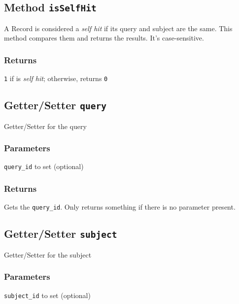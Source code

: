 \subsection*{Method \texttt{isSelfHit}\label{Method_isSelfHit}}


A Record is considered a \textit{self hit} if its query and subject are the same. This
method compares them and returns the results. It's case-sensitive.

\subsubsection*{Returns\label{Returns}}


\texttt{1} if is \textit{self hit}; otherwise, returns \texttt{0}

\subsection*{Getter/Setter \texttt{query}\label{Getter_Setter_query}}


Getter/Setter for the query

\subsubsection*{Parameters\label{Parameters}}
\begin{description}

\item[{\texttt{query\_id} to set (optional)}] \mbox{}\end{description}
\subsubsection*{Returns\label{Returns}}


Gets the \texttt{query\_id}. Only returns something if there is no parameter present.

\subsection*{Getter/Setter \texttt{subject}\label{Getter_Setter_subject}}


Getter/Setter for the subject

\subsubsection*{Parameters\label{Parameters}}
\begin{description}

\item[{\texttt{subject\_id} to set (optional)}] \mbox{}\end{description}
